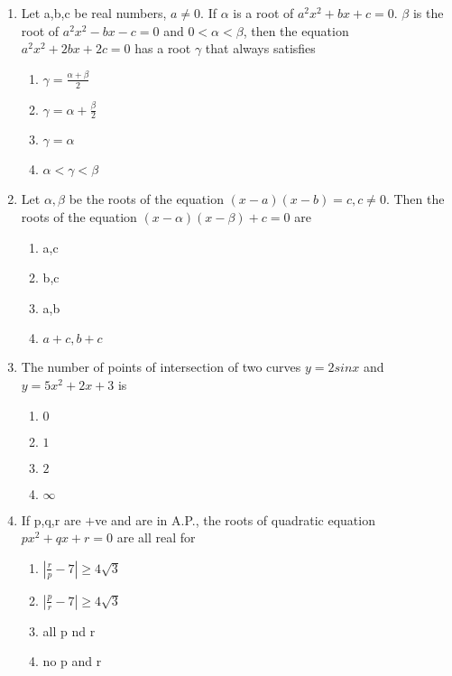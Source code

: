 \begin{enumerate}[label=\arabic*.,ref=\thesubsection.\theenumi]
\item Let a,b,c be real numbers, $a\neq0$. If $\alpha$ is a root of $a^{2}x^{2}+bx+c=0$. $\beta$ is the root of $a^{2}x^{2}-bx-c=0$ and $0<\alpha<\beta$, then the equation $a^{2}x^{2}+2bx+2c=0$ has a root $\gamma$ that always satisfies
\begin{enumerate}
\item $\gamma = \frac{\alpha+\beta}{2}$
\item $\gamma = \alpha+\frac{\beta}{2}$ 
\item $\gamma = \alpha$
\item $\alpha<\gamma<\beta$
\end{enumerate}


\item Let $\alpha, \beta$ be the roots of the equation $(x-a)(x-b)=c, c\neq0$. Then the roots of the equation $(x-\alpha)(x-\beta)+c=0$ are
\begin{enumerate}
\item a,c
\item b,c 
\item a,b
\item $a+c,b+c$
\end{enumerate}

\item The number of points of intersection of two curves $y=2 sinx$ and $y=5x^{2}+2x+3$ is
\begin{enumerate}
\item $0$
\item $1$ 
\item $2$
\item $\infty$ 
\end{enumerate}

\item If p,q,r are $+$ve and are in A.P., the roots of quadratic equation $px^{2}+qx+r=0$ are all real for
\begin{enumerate}
\item $|\frac{r}{p}-7|\geq{4\sqrt{3}}$
\item $|\frac{p}{r}-7|\geq{4\sqrt{3}}$ 
\item all p nd r
\item no p and r 
\end{enumerate}


\end{enumerate}
